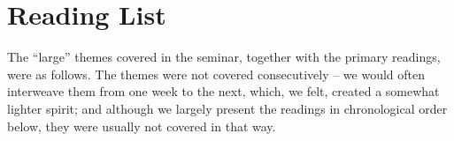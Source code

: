 \appendix
%

%
%
%
%
%
%
%

%

%

%
%
%
%
%
%
%
%
%
%
%

%

%

%

%

%


\section{Reading List}
The ``large'' themes
covered in the seminar, together with the primary readings, were as follows.  The themes
were not covered consecutively -- we would often interweave them from one week to the next, which, we felt, created a somewhat lighter spirit;
and although we largely present the readings in chronological order below, they were usually not covered in that way.

 


